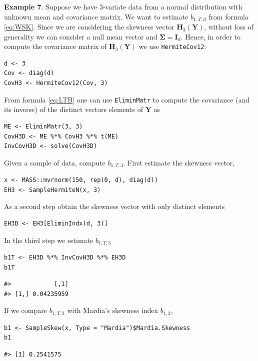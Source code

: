 \textbf{Example 7}. Suppose we have \(3\)-variate data from a normal distribution with unknown mean and covariance matrix. We want to estimate \(b_{1,T,d}\) from formula \eqref{eq:WSK}. Since we are considering the skewness vector \(\mathbf{H}_3(\mathbf{Y})\), without loss of generality we can consider a null mean vector and \(\boldsymbol{\Sigma}= \mathbf{I}_d\). Hence, in order to compute the covariance matrix of \(\mathbf{H}_3(\mathbf{Y})\) we use \texttt{HermiteCov12}:

\begin{verbatim}
d <- 3
Cov <- diag(d)
CovH3 <- HermiteCov12(Cov, 3)
\end{verbatim}

From formula \eqref{eq:LTB} one can use \texttt{EliminMatr} to compute the covariance (and its inverse) of the distinct vectors elements of \(\mathbf{Y}\) as

\begin{verbatim}
ME <- EliminMatr(3, 3)
CovH3D <- ME %*% CovH3 %*% t(ME)
InvCovH3D <- solve(CovH3D)
\end{verbatim}

Given a sample of data, compute \(b_{1,T,3}\). First estimate the skewness vector,

\begin{verbatim}
x <- MASS::mvrnorm(150, rep(0, d), diag(d))
EH3 <- SampleHermiteN(x, 3)
\end{verbatim}

As a second step obtain the skewness vector with only distinct elements

\begin{verbatim}
EH3D <- EH3[EliminIndx(d, 3)]
\end{verbatim}

In the third step we estimate \(b_{1,T,3}\)

\begin{verbatim}
b1T <- EH3D %*% InvCovH3D %*% EH3D
b1T
\end{verbatim}

\begin{verbatim}
#>            [,1]
#> [1,] 0.04235959
\end{verbatim}

If we compare \(b_{1,T,3}\) with Mardia's skewness index \(b_{1,3}\),

\begin{verbatim}
b1 <- SampleSkew(x, Type = "Mardia")$Mardia.Skewness
b1
\end{verbatim}

\begin{verbatim}
#> [1] 0.2541575
\end{verbatim}

